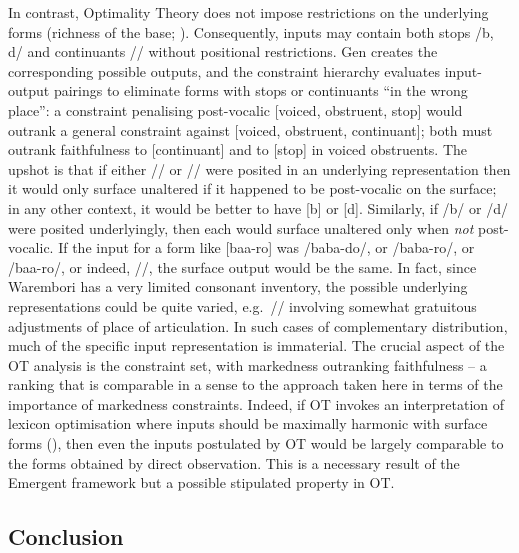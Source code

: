 In contrast, Optimality Theory does not impose restrictions on the underlying forms (richness of the base; \citealt{Prince+:1993}). Consequently, inputs may contain  both stops /b, d/ and continuants // without positional restrictions. Gen creates the corresponding possible outputs, and  the constraint hierarchy evaluates  input-output pairings to eliminate forms with stops or continuants ``in the wrong place'': a constraint penalising post-vocalic [voiced, obstruent, stop] would outrank a general constraint against [voiced, obstruent, continuant]; both must outrank faithfulness to [continuant]  and to [stop] in voiced obstruents. The upshot is that if either // or // were posited in an underlying representation then it would only surface unaltered if it happened to be post-vocalic on the surface; in any other context, it would be better to have [b] or [d]. Similarly, if /b/ or /d/ were posited underlyingly, then each would surface unaltered only when {\it not} post-vocalic. If the input for a form like [baa-ro] was /baba-do/, or /baba-ro/, or /baa-ro/, or indeed, //, the surface output would be the same. In fact, since Warembori has a very limited consonant inventory, the possible underlying representations could be quite varied, e.g.\  // involving somewhat gratuitous adjustments of place of articulation. In such cases of complementary distribution, much of the specific input representation is immaterial. The crucial aspect of the OT analysis is the constraint set, with markedness outranking faithfulness -- a ranking that is comparable in a sense to the approach taken here in terms of the importance of markedness constraints. Indeed, if OT invokes an interpretation of lexicon optimisation where inputs should be maximally harmonic with surface forms (\citealt{Prince+:1993}), then even the inputs postulated by OT would be largely comparable to the forms obtained by direct observation. This is a necessary result of the Emergent framework but a possible stipulated property in OT.



\subsection{Conclusion}\label{section_Warembori_conclusion}

